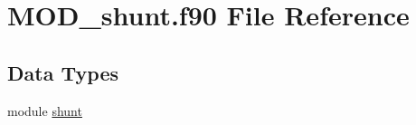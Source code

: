 \hypertarget{MOD__shunt_8f90}{\section{M\-O\-D\-\_\-shunt.\-f90 File Reference}
\label{MOD__shunt_8f90}
}
\subsection*{Data Types}
\begin{DoxyCompactItemize}
\item 
module \hyperlink{classshunt}{shunt}
\end{DoxyCompactItemize}
